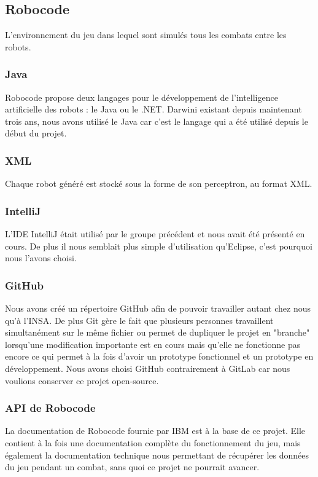 \documentclass[a4paper,11pt]{article}
\begin{document}
\subsection{Robocode}
L'environnement du jeu dans lequel sont simulés tous les combats entre les robots.

\subsubsection{Java}
Robocode propose deux langages pour le développement de l'intelligence artificielle des robots : le Java ou le .NET. Darwini existant depuis maintenant trois ans, nous avons utilisé le Java car c'est le langage qui a été utilisé depuis le début du projet.

\subsubsection{XML}
Chaque robot généré est stocké sous la forme de son perceptron, au format XML. 

\subsubsection{IntelliJ}
L'IDE IntelliJ était utilisé par le groupe précédent et nous avait été présenté en cours. De plus il nous semblait plus simple d'utilisation qu'Eclipse, c'est pourquoi nous l'avons choisi.

\subsubsection{GitHub}
Nous avons créé un répertoire GitHub afin de pouvoir travailler autant chez nous qu'à l'INSA. De plus Git gère le fait que plusieurs personnes travaillent simultanément sur le même fichier ou permet de dupliquer le projet en "branche" lorsqu'une modification importante est en cours mais qu'elle ne fonctionne pas encore ce qui permet à la fois d'avoir un prototype fonctionnel et un prototype en développement. Nous avons choisi GitHub contrairement à GitLab car nous voulions conserver ce projet open-source.

\subsubsection{API de Robocode}
La documentation de Robocode fournie par IBM est à la base de ce projet. Elle contient à la fois une documentation complète du fonctionnement du jeu, mais également la documentation technique nous permettant de récupérer les données du jeu pendant un combat, sans quoi ce projet ne pourrait avancer.
\end{document}
